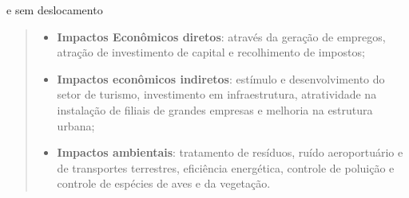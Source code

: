e sem deslocamento
\begin{quote}
   \begin{itemize}
        \item {\bf Impactos Econômicos diretos}: através da geração de empregos, atração de investimento de capital e recolhimento de impostos;
        \item {\bf Impactos econômicos indiretos}: estímulo e desenvolvimento do setor de turismo, investimento em infraestrutura, atratividade na instalação de filiais de grandes empresas e melhoria na estrutura urbana;
        \item {\bf Impactos ambientais}: tratamento de resíduos, ruído aeroportuário e de transportes terrestres, eficiência energética, controle de poluição e controle de espécies de aves e da vegetação.
    \end{itemize}
\end{quote}

